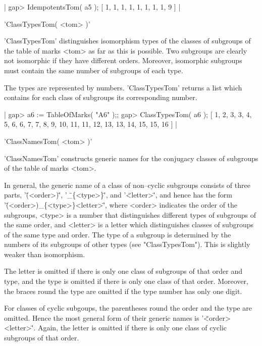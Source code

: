 |    gap> IdempotentsTom( a5 );
    [ 1, 1, 1, 1, 1, 1, 1, 1, 9 ] |


'ClassTypesTom( <tom> )'

'ClassTypesTom'   distinguishes  isomorphism  types  of  the  classes  of
subgroups of the  table of marks <tom> as  far  as this is possible.  Two
subgroups  are  clearly  not  isomorphic  if  they have different orders.
Moreover, isomorphic subgroups must contain the  same number of subgroups
of each type.

The types are represented by  numbers.   'ClassTypesTom' returns  a  list
which contains for each class of subgroups its corresponding number.

|    gap> a6 := TableOfMarks( "A6" );;
    gap> ClassTypesTom( a6 );
    [ 1, 2, 3, 3, 4, 5, 6, 6, 7, 7, 8, 9, 10, 11, 11, 12, 13, 13, 14, 15,
      15, 16 ] |


'ClassNamesTom( <tom> )'

'ClassNamesTom' constructs generic  names  for  the conjugacy classes  of
subgroups of the table of marks <tom>.

In general, the generic name of a class of non--cyclic subgroups consists
of three  parts, '\"(<order>)\"', '\"\_\{<type>\}\"', and '\"<letter>\"',
and hence has the form '\"(<order>)\_\{<type>\}<letter>\"', where <order>
indicates  the  order   of  the  subgroups,   <type>  is  a  number  that
distinguishes  different  types  of  subgroups  of  the  same order,  and
<letter> is a letter which distinguishes classes of subgroups of the same
type  and order.  The type  of a subgroup is determined by the numbers of
its  subgroups of other  types  (see "ClassTypesTom").  This  is slightly
weaker than isomorphism.

The  letter is omitted  if there is only  one class of subgroups  of that
order and  type, and the  type is  omitted if there is only one  class of
that order.  Moreover, the braces round the type are  omitted if the type
number has only one digit.

For classes of cyclic subgoups, the parentheses  round  the order and the
type are omitted.  Hence  the most general form of their generic names is
'\"<order>\,<letter>\"'.  Again, the  letter is omitted if there  is only
one class of cyclic subgroups of that order.

